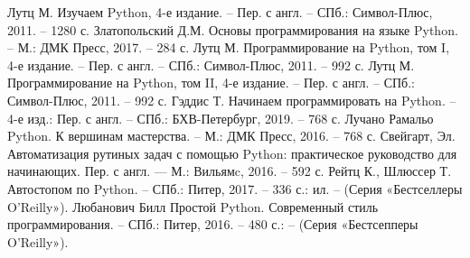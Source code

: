 
\begin{thebibliography}{9}

     Лутц М. Изучаем Python, 4-е издание. – Пер. с англ. – СПб.: Символ-Плюс, 2011. – 1280 с.
     Златопольский Д.М. Основы программирования на языке Python. – М.: ДМК Пресс, 2017. – 284 с.
     Лутц М. Программирование на Python, том I, 4-е издание. – Пер. с англ. – СПб.: Символ-Плюс, 2011. – 992 с.
     Лутц М. Программирование на Python, том II, 4-е издание. – Пер. с англ. – СПб.: Символ-Плюс, 2011. – 992 с.
	 Гэддис Т. Начинаем программировать на Python.  – 4-е изд.: Пер. с англ. – СПб.: БХВ-Петербург, 2019. – 768 с.
	 Лучано Рамальо Python. К вершинам мастерства. – М.: ДМК Пресс, 2016. – 768 с.
	 Свейгарт, Эл. Автоматизация рутиных задач с помощью Python: практическое руководство для начинающих. Пер. с англ. — М.: Вильямc, 2016. – 592 с.
	 Рейтц К., Шлюссер Т. Автостопом по Python. – СПб.: Питер, 2017. – 336 с.: ил. – (Серия «Бестселлеры O’Reilly»).
	 Любанович Билл Простой Python. Современный стиль программирования. – СПб.: Питер, 2016. – 480 с.: – (Серия «Бестсепперы O’Reilly»).  
\end{thebibliography}
